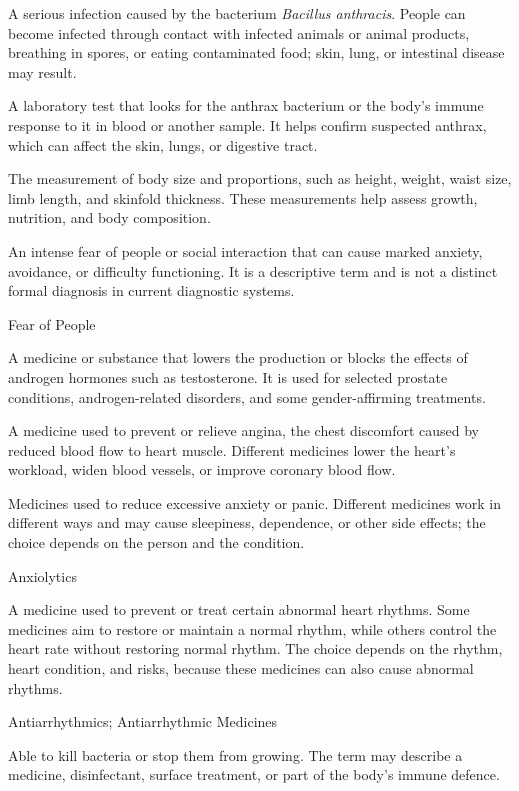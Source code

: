  A serious infection caused by the bacterium \textit{Bacillus anthracis}. People can become infected through contact with infected animals or animal products, breathing in spores, or eating contaminated food; skin, lung, or intestinal disease may result.

 A laboratory test that looks for the anthrax bacterium or the body’s immune response to it in blood or another sample. It helps confirm suspected anthrax, which can affect the skin, lungs, or digestive tract.

 The measurement of body size and proportions, such as height, weight, waist size, limb length, and skinfold thickness. These measurements help assess growth, nutrition, and body composition.

 An intense fear of people or social interaction that can cause marked anxiety, avoidance, or difficulty functioning. It is a descriptive term and is not a distinct formal diagnosis in current diagnostic systems.

\synonyms
Fear of People

 A medicine or substance that lowers the production or blocks the effects of androgen hormones such as testosterone. It is used for selected prostate conditions, androgen-related disorders, and some gender-affirming treatments.

 A medicine used to prevent or relieve angina, the chest discomfort caused by reduced blood flow to heart muscle. Different medicines lower the heart’s workload, widen blood vessels, or improve coronary blood flow.

 Medicines used to reduce excessive anxiety or panic. Different medicines work in different ways and may cause sleepiness, dependence, or other side effects; the choice depends on the person and the condition.

\synonyms
Anxiolytics

 A medicine used to prevent or treat certain abnormal heart rhythms. Some medicines aim to restore or maintain a normal rhythm, while others control the heart rate without restoring normal rhythm. The choice depends on the rhythm, heart condition, and risks, because these medicines can also cause abnormal rhythms.

\synonyms
Antiarrhythmics; Antiarrhythmic Medicines

 Able to kill bacteria or stop them from growing. The term may describe a medicine, disinfectant, surface treatment, or part of the body’s immune defence.

